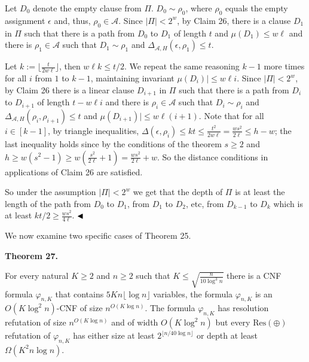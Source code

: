 Let $D_{0}$ denote the empty clause from $\Pi$.
$D_{0}\sim\rho_{0}$, where $\rho_{0}$ equals the empty assignment $\epsilon$ and, thus, $\rho_{0}\in\mathcal{A}$.
Since $|\Pi|<2^{w}$, by Claim 26, there is a clause $D_{1}$ in $\Pi$ such that there is a path from
$D_{0}$ to $D_{1}$ of length $t$ and $\mu(D_{1})\leq w\ell$ and there is $\rho_{1}\in\mathcal{A}$ such that
$D_{1}\sim\rho_{1}$ and $\Delta_{\mathcal{A},H}(\epsilon,\rho_{1})\leq t$.\par



Let $k:=\lfloor\frac{t}{2w\ell}\rfloor$, then $w\ell k\leq t/2$.
We repeat the same reasoning $k-1$ more times for all $i$ from $1$ to $k-1$, maintaining invariant $\mu(D_{i})|\leq w\ell i$.
Since $|\Pi|<2^{w}$, by Claim 26 there is a linear clause $D_{i+1}$ in $\Pi$ such that there is a path from $D_{i}$
to $D_{i+1}$ of length $t-w\ell i$ and there is $\rho_{i}\in\mathcal{A}$ such that $D_{i}\sim\rho_{i}$ and
$\Delta_{\mathcal{A},H}(\rho_{i},\rho_{i+1})\leq t$ and $\mu(D_{i+1})|\leq w\ell(i+1)$.
Note that for all $i\in[k-1]$, by triangle inequalities,
$\Delta(\epsilon,\rho_{i})\leq kt\leq\frac{t^{2}}{2w\ell}=\frac{ws^{2}}{2\ell}\leq h-w$;
the last inequality holds since by the conditions of the theorem $s\geq 2$ and
$h\geq w(s^{2}-1)\geq w(\frac{s^{2}}{2\ell}+1)=\frac{ws^{2}}{2\ell}+w$. So the distance conditions in applications of
Claim 26 are satisfied.\par



So under the assumption $|\Pi|<2^{w}$ we get that the depth of $\Pi$ is at least the length of the path from
$D_{0}$ to $D_{1}$, from $D_{1}$ to $D_{2}$, etc, from $D_{k-1}$ to $D_{k}$ which is at least $kt/2\geq\frac{ws^{2}}{4\ell}$.
$\hfill\blacktriangleleft$\par



We now examine two specific cases of Theorem 25.\par



\par\medskip\noindent\textbf{
Theorem 27.
}\par



For every natural $K\geq 2$ and $n\geq 2$ such that $K\leq\sqrt{\frac{n}{10\log^{3}n}}$ there is a CNF formula
$\varphi_{n,K}$ that contains $5Kn\lfloor\log n\rfloor$ variables, the formula $\varphi_{n,K}$ is an
$O(K\log^{2}n)$-CNF of size $n^{O(K\log n)}$.
The formula $\varphi_{n,K}$ has resolution refutation of size $n^{O(K\log n)}$ and of width $O(K\log^{2}n)$
but every $\mathrm{Res}(\oplus)$ refutation of $\varphi_{n,K}$ has either size at least $2^{\lfloor n/40\log n\rfloor}$ or depth at least
$\Omega(K^{2}n\log n)$.\par



